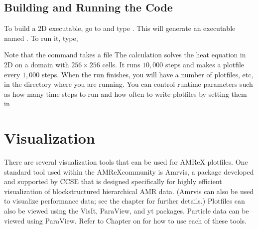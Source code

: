 \documentclass[letterpaper,10pt,english]{sphinxmanual}
\begin{document}
\subsection{Building and Running the Code}
\label{\detokenize{GettingStarted:building-and-running-the-code}}
\sphinxAtStartPar
To build a 2D executable, go to
 and type . This
will generate an executable named . To run it, type,

\begin{sphinxVerbatim}[commandchars=\\\{\}]
\end{sphinxVerbatim}

\sphinxAtStartPar
Note that the command takes a file  The calculation solves the
heat equation in 2D on a domain with \(256 \times 256\) cells.  It runs
\(10,000\) steps and makes a plotfile every \(1,000\) steps.  When the
run finishes, you will have a number of plotfiles,  etc,
in the directory where you are running.  You can control runtime parameters
such as how many time steps to run and how often to write plotfiles by setting
them in 


\section{Visualization}
\label{\detokenize{GettingStarted:visualization}}
\sphinxAtStartPar
There are several visualization tools that can be used for AMReX plotfiles.
One standard tool used within the AMReX\sphinxhyphen{}community is Amrvis, a package
developed and supported by CCSE that is designed specifically for highly
efficient visualization of block\sphinxhyphen{}structured hierarchical AMR data.  (Amrvis can
also be used to visualize performance data; see the {\hyperref[\detokenize{AMReX_Profiling_Tools_Chapter:chap-amrex-based-profiling-tools}]{}} chapter for further details.) Plotfiles can also be viewed
using the VisIt, ParaView, and yt packages.  Particle data can be viewed using
ParaView.  Refer to Chapter on {\hyperref[\detokenize{Visualization_Chapter:chap-visualization}]{}} for how to use each of
these tools.
\end{document}
